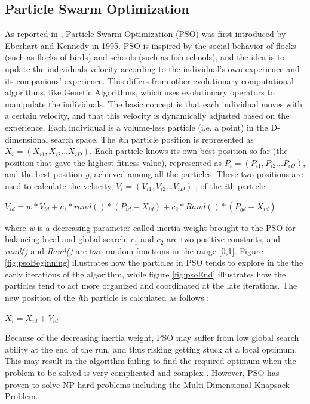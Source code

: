 \subsection{Particle Swarm Optimization}
As reported in \citet{shi99}, Particle Swarm Optimization (PSO) was first introduced by Eberhart and Kennedy in 1995. PSO is inspired by the social behavior of flocks (such as flocks of birds) and schools (such as fish schools), and the idea is to update the individuals velocity according to the individual's own experience and its companions' experience. This differs from other evolutionary computational algorithms, like Genetic Algorithms, which uses evolutionary operators to manipulate the individuals. The basic concept is that each individual moves with a certain velocity, and that this velocity is dynamically adjusted based on the experience. Each individual is a volume-less particle (i.e. a point) in the D-dimensional search space. The \textit{i}th particle position is represented as $X_i = (X_{i1},X_{i2}...X_{iD})$. Each particle knows its own best position so far (the position that gave the highest fitness value), represented as $P_i = (P_{i1},P_{i2}...P_{iD})$, and the best position \textit{g}, achieved among all the particles. These two positions are used to calculate the velocity, $V_i = (V_{i1},V_{i2}...V_{iD})$ ,  of the \textit{i}th particle \citep{shi99}: 
\newline
\newline
\centerline{$V_{id} = w * V_{id} + c_1 * rand() * (P_{id}-X_{id}) + c_2 * Rand() * (P_{gd}-X_{id})$}
\newline
\newline
where \textit{w} is a decreasing parameter called inertia weight brought to the PSO for balancing local and global search, $c_1$ and $c_2$ are two positive constants, and \textit{rand()} and \textit{Rand()} are two random functions in the range [0,1]. Figure \vref{fig:psoBeginning} illustrates how the particles in PSO tends to explore in the the early iterations of the algorithm, while figure \vref{fig:psoEnd} illustrates how the particles tend to act more organized and coordinated at the late iterations. The new position of the \textit{i}th particle is calculated as follows \citep{shi99}:
\newline
\newline
\centerline{$X_i = X_{id} + V_{id}$}
\newline
\newline
Because of the decreasing inertia weight, PSO may suffer from low global search ability at the end of the run, and thus risking getting stuck at a local optimum. This may result in the algorithm failing to find the required optimum when the problem to be solved is very complicated and complex \citep{shi99}. However, PSO has proven to solve NP hard problems including the Multi-Dimensional Knapsack Problem\citep{wan09}. 

